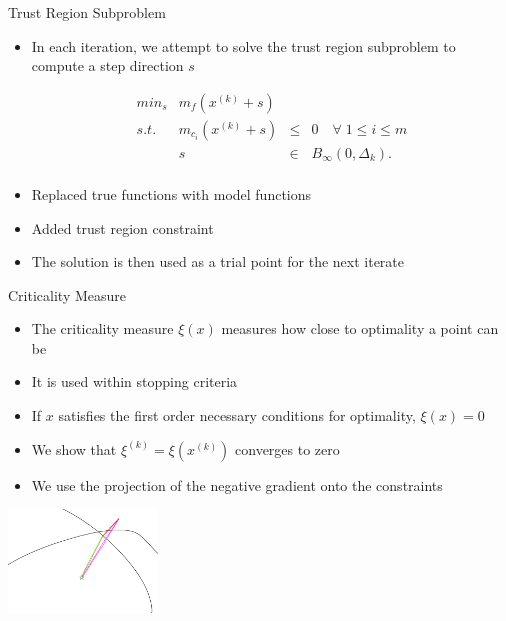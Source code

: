 \documentclass{beamer}
\newcommand{\xk}{{{x}^{(k)}}}
\newcommand{\dk}{{\Delta_k}}
\newcommand{\mk}{{m_f}}
\newcommand{\mck}{{m_{c_i}}}
\begin{document}
\begin{frame}{Trust Region Subproblem}
	\begin{itemize}
		\item In each iteration, we attempt to solve the trust region subproblem to compute a step direction $s$

		\begin{displaymath}
\begin{array}{lrcc}
min_s & \mk(\xk + s)   &	 &			\\
s.t.  &  \mck(\xk + s) & \le & 0   \quad \forall \; 1 \le i \le m	   \\
	  &  s & \in & B_{\infty}(0, \dk).  \\
\end{array}
		\end{displaymath}
		\item Replaced true functions with model functions
		\item Added trust region constraint
		\item The solution is then used as a trial point for the next iterate
	\end{itemize}
\end{frame}


\begin{frame}{Criticality Measure}
	\begin{itemize}
		\item The criticality measure $\xi(x)$ measures how close to optimality a point can be
		\item It is used within stopping criteria
		\item If $x$ satisfies the first order necessary conditions for optimality, $\xi(x) = 0$
		\item We show that $\xi^{(k)} = \xi(\xk)$ converges to zero
		\item We use the projection of the negative gradient onto the constraints
	\end{itemize}
	\begin{center}
		\includegraphics[width=150px]{images/criticality.png}
	\end{center}
\end{frame}
\end{document}
